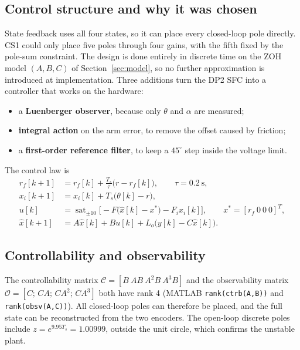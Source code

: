\documentclass[11pt,a4paper]{article}
\begin{document}
\subsection{Control structure and why it was chosen}
State feedback uses all four states, so it can place every closed-loop
pole directly. CS1 could only place five poles through four gains, with
the fifth fixed by the pole-sum constraint. The design is done entirely
in discrete time on the ZOH model $(A,B,C)$ of Section~\ref{sec:model},
so no further approximation is introduced at implementation. Three
additions turn the DP2 SFC into a controller that works on the hardware:
\begin{itemize}[nosep]
\item a \textbf{Luenberger observer}, because only $\theta$ and $\alpha$ are measured;
\item \textbf{integral action} on the arm error, to remove the offset
  caused by friction;
\item a \textbf{first-order reference filter}, to keep a $45^\circ$ step
  inside the voltage limit.
\end{itemize}
The control law is
\begin{align}
r_f[k+1]&=r_f[k]+\tfrac{T_s}{\tau}\big(r-r_f[k]\big),\qquad\tau=0.2~\mathrm s,\\
x_i[k+1]&=x_i[k]+T_s\big(\theta[k]-r\big),\\
u[k]&=\operatorname{sat}_{\pm10}\Big[-F\big(\hat x[k]-x^*\big)-F_ix_i[k]\Big],\qquad x^*=[r_f\ 0\ 0\ 0]^T,\\
\hat x[k+1]&=A\hat x[k]+Bu[k]+L_o\big(y[k]-C\hat x[k]\big).
\end{align}

\subsection{Controllability and observability}
The controllability matrix $\mathcal C=[B\ AB\ A^2B\ A^3B]$ and the
observability matrix $\mathcal O=[C;\,CA;\,CA^2;\,CA^3]$ both have rank
4 (MATLAB \texttt{rank(ctrb(A,B))} and \texttt{rank(obsv(A,C))}). All
closed-loop poles can therefore be placed, and the full state can be
reconstructed from the two encoders. The open-loop discrete poles include
$z=e^{9.95T_s}=1.00999$, outside the unit circle, which confirms the
unstable plant.
\end{document}
